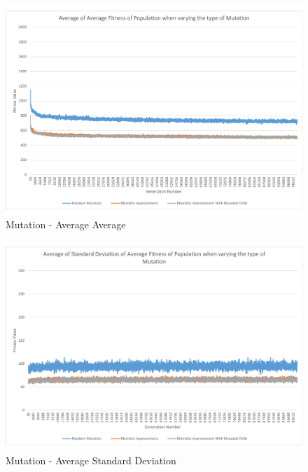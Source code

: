 \begin{landscape}
\begin{figure}[thbp]
	\centerline{\includegraphics[height=0.945\textwidth]{figures/CircleTests/Mutation/CircleTestMutationAverageAverage.pdf}}
	\caption{Mutation - Average Average}
	\label{fig:ctmaa}
\end{figure}
\end{landscape}

\begin{landscape}
\begin{figure}[thbp]
	\centerline{\includegraphics[height=0.945\textwidth]{figures/CircleTests/Mutation/CircleTestMutationAverageStandardDeviation.pdf}}
	\caption{Mutation - Average Standard Deviation}
	\label{fig:ctmasd}
\end{figure}
\end{landscape}

